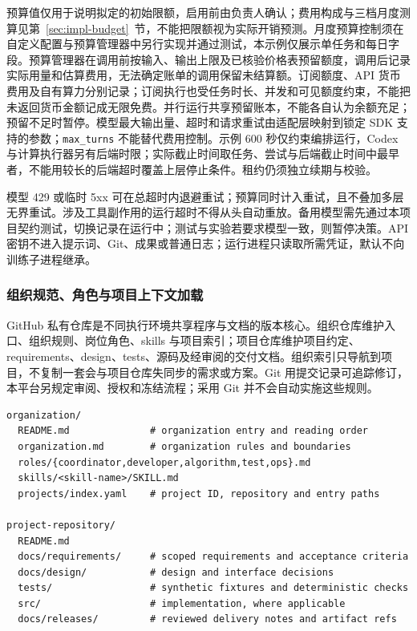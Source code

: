 \documentclass[11pt,a4paper]{article}
\begin{document}
预算值仅用于说明拟定的初始限额，启用前由负责人确认；费用构成与三档月度测算见第~\ref{sec:impl-budget}~节，不能把限额视为实际开销预测。月度预算控制须在自定义配置与预算管理器中另行实现并通过测试，本示例仅展示单任务和每日字段。预算管理器在调用前按输入、输出上限及已核验价格表预留额度，调用后记录实际用量和估算费用，无法确定账单的调用保留未结算额。订阅额度、API 货币费用及自有算力分别记录；订阅执行也受任务时长、并发和可见额度约束，不能把未返回货币金额记成无限免费。并行运行共享预留账本，不能各自认为余额充足；预留不足时暂停。模型最大输出量、超时和请求重试由适配层映射到锁定 SDK 支持的参数；\texttt{max\_turns} 不能替代费用控制。示例 600 秒仅约束编排运行，Codex 与计算执行器另有后端时限；实际截止时间取任务、尝试与后端截止时间中最早者，不能用较长的后端超时覆盖上层停止条件。租约仍须独立续期与校验。

模型 429 或临时 5xx 可在总超时内退避重试；预算同时计入重试，且不叠加多层无界重试。涉及工具副作用的运行超时不得从头自动重放。备用模型需先通过本项目契约测试，切换记录在运行中；测试与实验若要求模型一致，则暂停决策。API 密钥不进入提示词、Git、成果或普通日志；运行进程只读取所需凭证，默认不向训练子进程继承。

\subsubsection{组织规范、角色与项目上下文加载}

GitHub 私有仓库是不同执行环境共享程序与文档的版本核心。组织仓库维护入口、组织规则、岗位角色、skills 与项目索引；项目仓库维护项目约定、requirements、design、tests、源码及经审阅的交付文档。组织索引只导航到项目，不复制一套会与项目仓库失同步的需求或方案。Git 用提交记录可追踪修订，本平台另规定审阅、授权和冻结流程；采用 Git 并不会自动实施这些规则。\cite{ch5-github-git}

\par\noindent\begin{minipage}{\linewidth}
\begin{lstlisting}[caption={组织与项目仓库的拟定内容；真实地址及权限由实施时登记}]
organization/
  README.md              # organization entry and reading order
  organization.md        # organization rules and boundaries
  roles/{coordinator,developer,algorithm,test,ops}.md
  skills/<skill-name>/SKILL.md
  projects/index.yaml    # project ID, repository and entry paths

project-repository/
  README.md
  docs/requirements/     # scoped requirements and acceptance criteria
  docs/design/           # design and interface decisions
  tests/                 # synthetic fixtures and deterministic checks
  src/                   # implementation, where applicable
  docs/releases/         # reviewed delivery notes and artifact refs
\end{lstlisting}
\end{minipage}\par
\end{document}
